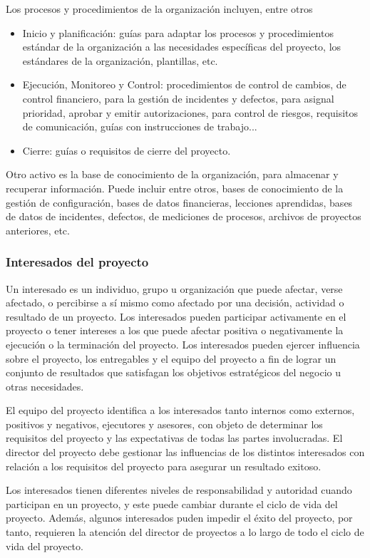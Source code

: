 Los procesos y procedimientos de la organización incluyen, entre otros
\begin{itemize}
\item{Inicio y planificación: guías para adaptar los procesos y procedimientos estándar de la organización a las necesidades específicas del proyecto, los estándares de la organización, plantillas, etc.}
\item{Ejecución, Monitoreo y Control: procedimientos de control de cambios, de control financiero, para la gestión de incidentes y defectos, para asignal prioridad, aprobar y emitir autorizaciones, para control de riesgos, requisitos de comunicación, guías con instrucciones de trabajo...}
\item{Cierre: guías o requisitos de cierre del proyecto.}
\end{itemize}

Otro activo es la base de conocimiento de la organización, para almacenar y recuperar información. Puede incluir entre otros, bases de conocimiento de la gestión de configuración, bases de datos financieras, lecciones aprendidas, bases de datos de incidentes, defectos, de mediciones de procesos, archivos de proyectos anteriores, etc.

\subsubsection{Interesados del proyecto}

Un  interesado  es  un  individuo,  grupo  u  organización  que  puede  afectar,  verse  afectado,  o  percibirse  a 
sí  mismo  como  afectado  por  una  decisión,  actividad  o  resultado  de  un  proyecto.  Los  interesados  pueden  participar activamente en el proyecto o tener intereses a los que puede afectar positiva o negativamente la ejecución o la terminación del proyecto. Los interesados pueden ejercer influencia sobre el proyecto, los entregables y el equipo del proyecto a fin de lograr un conjunto de resultados que satisfagan los objetivos estratégicos del negocio u otras necesidades.

El equipo del proyecto identifica a los interesados tanto internos como externos, positivos y negativos, ejecutores y asesores, con objeto de determinar los requisitos del proyecto y las expectativas de todas las partes involucradas. El director del proyecto debe gestionar las influencias de los distintos interesados con relación a los requisitos del proyecto para asegurar un resultado exitoso.

Los interesados tienen diferentes niveles de responsabilidad y autoridad cuando participan en un proyecto, y este puede cambiar durante el ciclo de vida del proyecto. Además, algunos interesados puden impedir el éxito del proyecto, por tanto, requieren la atención del director de proyectos a lo largo de todo el ciclo de vida del proyecto.
